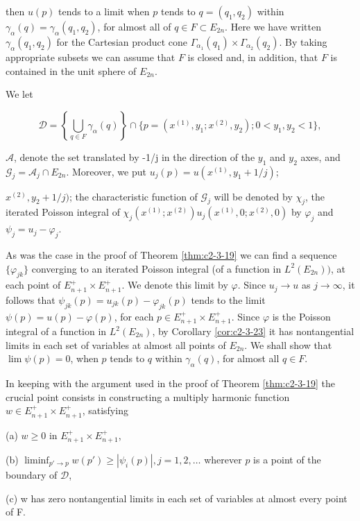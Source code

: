 then $u(p)$ tends to a limit when $p$ tends to $q = (q_1, q_2)$ within $\gamma_\alpha(q) = \gamma_\alpha(q_1, q_2)$, for almost all of $q \in F \subset E_{2n}$. Here we have written $\gamma_\alpha(q_1, q_2)$ for the Cartesian product cone $\Gamma_{\alpha_1}(q_1) \times \Gamma_{\alpha_2}(q_2)$. By taking appropriate subsets we can assume that $F$ is closed and, in addition, that $F$ is contained in the unit sphere of $E_{2n}$.

We let

\[
\mathcal{D}=\left\{\bigcup_{q\in F}\gamma_{\alpha}(q)\right\}\cap\{p=(x^{(1)},y_{1};x^{(2)},y_{2});0<y_{1},y_{2}<1\},
\]

$\mathcal{A}$, denote the set translated by -1/j in the direction of the $y_1$ and $y_2$ axes, and $\mathcal{G}_j = \mathcal{A}_j \cap E_{2n}$. Moreover, we put $u_j(p) = u(x^{(1)}, y_1 + 1/j)$;

$x^{(2)}, y_2 + 1/j)$; the characteristic function of $\mathcal{G}_j$ will be denoted by $\chi_j$, the iterated Poisson integral of $\chi_j(x^{(1)}; x^{(2)})u_j(x^{(1)}, 0; x^{(2)}, 0)$ by $\varphi_j$ and $\psi_j = u_j - \varphi_j$.

As was the case in the proof of Theorem \ref{thm:c2-3-19} we can find a sequence $\{\varphi_{jk}\}$ converging to an iterated Poisson integral (of a function in $L^{2}(E_{2n}))$, at each point of $E_{n+1}^{+}\times E_{n+1}^{+}$. We denote this limit by $\varphi$. Since $u_j\to u$ as $j\to\infty$, it follows that $\psi_{jk}(p)=u_{jk}(p)-\varphi_{jk}(p)$ tends to the limit $\psi(p)=u(p)-\varphi(p)$, for each $p\in E_{n+1}^{+}\times E_{n+1}^{+}$. Since $\varphi$ is the Poisson integral of a function in $L^{2}(E_{2n})$, by Corollary \ref{cor:c2-3-23} it has nontangential limits in each set of variables at almost all points of $E_{2n}$. We shall show that $\lim\psi(p)=0$, when $p$ tends to $q$ within $\gamma_{\alpha}(q)$, for almost all $q\in F$.

In keeping with the argument used in the proof of Theorem \ref{thm:c2-3-19} the crucial point consists in constructing a multiply harmonic function $w \in E_{n+1}^{+} \times E_{n+1}^{+}$, satisfying

(a) $w \geq 0$ in $E_{n+1}^{+} \times E_{n+1}^{+}$,

(b) $\liminf_{p' \to p} w(p') \geq |\psi_i(p)|, j = 1, 2, \ldots$ wherever $p$ is a point of the boundary of $\mathcal{D}$,

(c) w has zero nontangential limits in each set of variables at almost every point of F.

